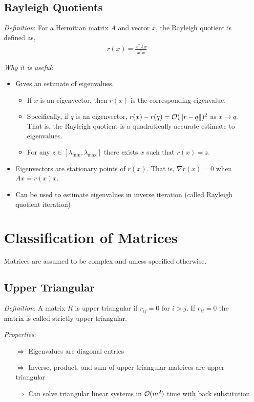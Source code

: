 \documentclass[12pt]{article}
\begin{document}
\subsection{Rayleigh Quotients}
\textit{Definition}: For a Hermitian matrix \( A \) and vector \( x \), the Rayleigh quotient is defined as,
\begin{align*}
    r(x) = \frac{x^*Ax}{x^*x}
\end{align*}

\textit{Why it is useful}:
\begin{itemize}[nolistsep]
    \item Gives an estimate of eigenvalues.
        \begin{itemize}[nolistsep]
            \item If \( x \) is an eigenvector, then \( r(x) \) is the corresponding eigenvalue.
            \item Specifically, if \( q \) is an eigenvector, \( r(x) - r(q) = \mathcal{O}(\left\lVert r-q\right\rVert)^2 \) as \( x\to q \). That is, the Rayleigh quotient is a quadratically accurate estimate to eigenvalues.
            \item For any \( z\in[\lambda_{\text{min}},\lambda_{\text{max}}] \) there exists \( x \) such that \( r(x) = z \).
        \end{itemize}
    \item Eigenvectors are stationary points of \( r(x) \). That is, \( \nabla r(x) = 0 \) when \( Ax = r(x) x \).
    \item Can be used to estimate eigenvalues in inverse iteration (called Rayleigh quotient iteration)
\end{itemize}





\pagebreak
\section{Classification of Matrices}
Matrices are assumed to be complex and unless specified otherwise.

\subsection{Upper Triangular}
\textit{Definition}: A matrix \( R \) is upper triangular if \( r_{ij} = 0 \) for \( i>j \).
If \( r_{ii} = 0 \) the matrix is called strictly upper triangular. 

\textit{Properties}:
\begin{itemize}[nolistsep]
    \item[\(\Rightarrow\)] Eigenvalues are diagonal entries
    \item[\(\Rightarrow\)] Inverse, product, and sum of upper triangular matrices are upper triangular
    \item[\(\Rightarrow\)] Can solve triangular linear systems in \( \mathcal{O}(m^2) \) time with back substitution
\end{itemize}
\end{document}
